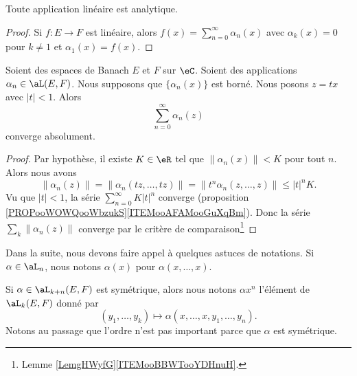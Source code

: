 \begin{proposition}	\label{PROPooMGWOooTeCDRk}
	Toute application linéaire est analytique.
\end{proposition}

\begin{proof}
	Si \(f \colon E\to F  \) est linéaire, alors \( f(x)=\sum_{n=0}^{\infty}\alpha_n(x)\) avec \( \alpha_k(x)=0\) pour \( k\neq 1\) et \( \alpha_1(x)=f(x)\).
\end{proof}

\begin{theorem}	\label{THOooNBNFooMsAorH}
	Soient des espaces de Banach \( E\) et \( F\) sur \( \eC\). Soient des applications \( \alpha_n\in\aL(E,F)\). Nous supposons que \( \{ \alpha_n(x) \}\) est borné. Nous posons \( z=tx\) avec \( | t |<1\). Alors
	\begin{equation}
		\sum_{n=0}^{\infty}\alpha_n(z)
	\end{equation}
	converge absolument.
\end{theorem}

\begin{proof}
	Par hypothèse, il existe \( K\in\eR\) tel que \( \| \alpha_n(x) \|<K\) pour tout \( n\). Alors nous avons
	\begin{equation}
		\| \alpha_n(z) \|=\| \alpha_n(tz,\ldots,tz) \|=\| t^n\alpha_n(z,\ldots,z) \|\leq | t |^nK.
	\end{equation}
	Vu que \( | t |<1\), la série \( \sum_{n=0}^{\infty}K| t |^n\) converge (proposition \ref{PROPooWOWQooWbzukS}\ref{ITEMooAFAMooGuXqBm}). Donc la série \( \sum_k\| \alpha_n(z) \|\) converge par le critère de comparaison\footnote{Lemme \ref{LemgHWyfG}\ref{ITEMooBBWTooYDHnuH}.}
\end{proof}

\begin{normaltext}		\label{NORMooQDCKooXHtrHQ}
	Dans la suite, nous devons faire appel à quelques astuces de notations. Si \( \alpha\in\aL_n\), nous notons \( \alpha(x)\) pour \( \alpha(x,\ldots,x)\).

	Si \( \alpha\in \aL_{k+n}(E,F)\) est symétrique, alors nous notons \( \alpha x^n\) l'élément de \(\aL_k(E,F) \) donné par
	\begin{equation}
		(y_1,\ldots,y_k)\mapsto \alpha(x,\ldots,x,y_1,\ldots,y_n).
	\end{equation}
	Notons au passage que l'ordre n'est pas important parce que \( \alpha\) est symétrique.
\end{normaltext}


